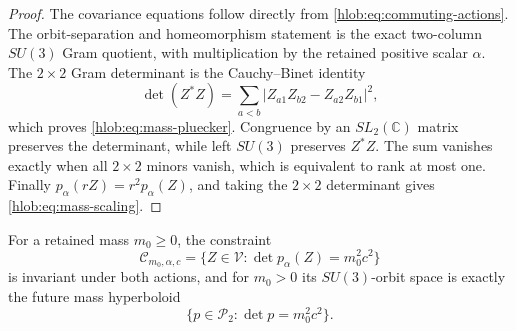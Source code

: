 \begin{proof}
The covariance equations follow directly from
\eqref{hlob:eq:commuting-actions}.  The orbit-separation and homeomorphism
statement is the exact two-column \(SU(3)\) Gram quotient, with multiplication
by the retained positive scalar \(\alpha\).  The \(2\times2\) Gram
determinant is the Cauchy--Binet identity
\[
 \det(Z^*Z)
 =\sum_{a<b}|Z_{a1}Z_{b2}-Z_{a2}Z_{b1}|^2,
\]
which proves \eqref{hlob:eq:mass-pluecker}.  Congruence by an
\(SL_2(\mathbb C)\) matrix preserves the determinant, while left \(SU(3)\)
preserves \(Z^*Z\).  The sum vanishes exactly when all \(2\times2\) minors
vanish, which is equivalent to rank at most one.  Finally
\(p_\alpha(rZ)=r^2p_\alpha(Z)\), and taking the \(2\times2\) determinant
gives \eqref{hlob:eq:mass-scaling}.
\end{proof}

For a retained mass \(m_0\geq0\), the constraint
\begin{equation}
 \mathscr C_{m_0,\alpha,c}
 =\{Z\in\mathscr V:\det p_\alpha(Z)=m_0^2c^2\}
 \label{hlob:eq:mass-shell-preimage}
\end{equation}
is invariant under both actions, and for \(m_0>0\) its \(SU(3)\)-orbit
space is exactly the future mass hyperboloid
\begin{equation}
 \{p\in\mathcal P_2:\det p=m_0^2c^2\}.
 \label{hlob:eq:mass-hyperboloid}
\end{equation}


